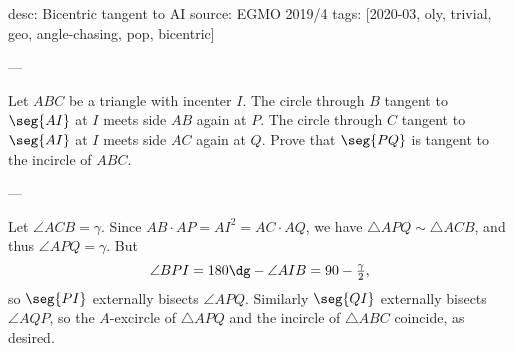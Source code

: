 desc: Bicentric tangent to AI
source: EGMO 2019/4
tags: [2020-03, oly, trivial, geo, angle-chasing, pop, bicentric]

---

Let $ABC$ be a triangle with incenter $I$. The circle through $B$ tangent to $\seg{AI}$ at $I$ meets side $AB$ again at $P$. The circle through $C$ tangent to $\seg{AI}$ at $I$ meets side $AC$ again at $Q$. Prove that $\seg{PQ}$ is tangent to the incircle of $ABC$.

---

Let $\angle ACB=\gamma$. Since $AB\cdot AP=AI^2=AC\cdot AQ$, we have $\triangle APQ\sim\triangle ACB$, and thus $\angle APQ=\gamma$. But \[\angle BPI=180\dg-\angle AIB=90-\tfrac\gamma2,\]
so $\seg{PI}$ externally bisects $\angle APQ$. Similarly $\seg{QI}$ externally bisects $\angle AQP$, so the $A$-excircle of $\triangle APQ$ and the incircle of $\triangle ABC$ coincide, as desired.
